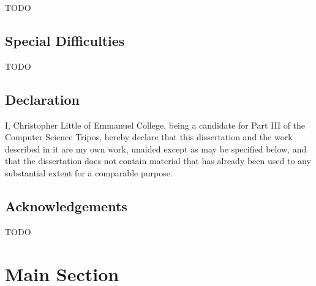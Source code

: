 \documentclass[12pt,a4paper,twoside,openright]{report}
\begin{document}
{\Large TODO}

\section*{Special Difficulties}

{\Large TODO}
 
\newpage
\section*{Declaration}

I, Christopher Little of Emmanuel College, being a candidate for Part 
III of the Computer Science Tripos, hereby declare
that this dissertation and the work described in it are my own work,
unaided except as may be specified below, and that the dissertation
does not contain material that has already been used to any substantial
extent for a comparable purpose.

\bigskip
{}

\medskip
{}

\tableofcontents

\listoffigures

\newpage
\section*{Acknowledgements}

{\Large TODO}


\pagestyle{headings}

\chapter{Main Section}



\printbibliography


\appendix

% 
\end{document}
